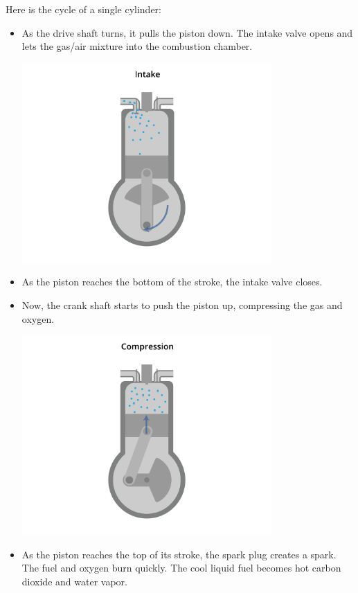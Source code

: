 Here is the cycle of a single cylinder:
\begin{itemize}

\item As the drive shaft turns,  it pulls the piston down.  The intake valve opens and lets the gas/air mixture into the combustion chamber.

\includegraphics[width=0.75\textwidth]{engine-09.png}

\item As the piston reaches the bottom of the stroke,  the intake valve closes.
\item Now, the crank shaft starts to push the piston up, compressing the gas and oxygen.

\includegraphics[width=0.75\textwidth]{engine-10.png}

\item As the piston reaches the top of its stroke,  the spark plug creates a spark.  The fuel and oxygen burn quickly.  The cool liquid fuel becomes hot carbon dioxide and water vapor.


\end{itemize}
